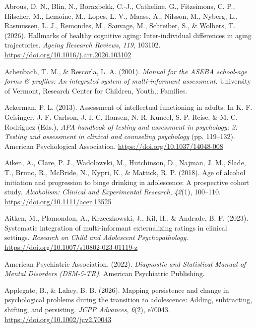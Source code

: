 \documentclass[
  american,
  letterpaper,
  12pt]{article}
\newlength{\cslhangindent}
\newenvironment{CSLReferences}[2] %
 {\begin{list}{}{%
  \setlength{\itemindent}{0pt}
  \setlength{\leftmargin}{0pt}
  \setlength{\parsep}{0pt}
  \ifodd #1
   \setlength{\leftmargin}{\cslhangindent}
   \setlength{\itemindent}{-1\cslhangindent}
  \fi
  \setlength{\itemsep}{#2\baselineskip}}}
 {\end{list}}
\begin{document}
\protect{}\label{refs}
\begin{CSLReferences}{1}{0}
Abrous, D. N., Blin, N., Boraxbekk, C.-J., Catheline, G., Fitzsimons, C.
P., Hilscher, M., Lemoine, M., Lopes, L. V., Maass, A., Nilsson, M.,
Nyberg, L., Rasmussen, L. J., Remondes, M., Sauvage, M., Schreiber, S.,
\& Wolbers, T. (2026). Hallmarks of healthy cognitive aging:
{Inter-individual} differences in aging trajectories. \emph{Ageing
Research Reviews}, \emph{119}, 103102.
\url{https://doi.org/10.1016/j.arr.2026.103102}

Achenbach, T. M., \& Rescorla, L. A. (2001). \emph{Manual for the
{ASEBA} school-age forms \& profiles: An integrated system of
multi-informant assessment}. University of Vermont, Research Center for
Children, Youth,; Families.

Ackerman, P. L. (2013). Assessment of intellectual functioning in
adults. In K. F. Geisinger, J. F. Carlson, J.-I. C. Hansen, N. R.
Kuncel, S. P. Reise, \& M. C. Rodriguez (Eds.), \emph{APA handbook of
testing and assessment in psychology: 2: Testing and assessment in
clinical and counseling psychology} (pp. 119--132). American
Psychological Association. \url{https://doi.org/10.1037/14048-008}

Aiken, A., Clare, P. J., Wadolowski, M., Hutchinson, D., Najman, J. M.,
Slade, T., Bruno, R., McBride, N., Kypri, K., \& Mattick, R. P. (2018).
Age of alcohol initiation and progression to binge drinking in
adolescence: {A} prospective cohort study. \emph{Alcoholism: Clinical
and Experimental Research}, \emph{42}(1), 100--110.
\url{https://doi.org/10.1111/acer.13525}

Aitken, M., Plamondon, A., Krzeczkowski, J., Kil, H., \& Andrade, B. F.
(2023). Systematic integration of multi-informant externalizing ratings
in clinical settings. \emph{Research on Child and Adolescent
Psychopathology}. \url{https://doi.org/10.1007/s10802-023-01119-z}

American Psychiatric Association. (2022). \emph{{Diagnostic and
Statistical Manual of Mental Disorders} ({DSM-5-TR})}. American
Psychiatric Publishing.

Applegate, B., \& Lahey, B. B. (2026). Mapping persistence and change in
psychological problems during the transition to adolescence: {Adding},
subtracting, shifting, and persisting. \emph{JCPP Advances},
\emph{6}(2), e70043. \url{https://doi.org/10.1002/jcv2.70043}


\end{CSLReferences}
\end{document}
